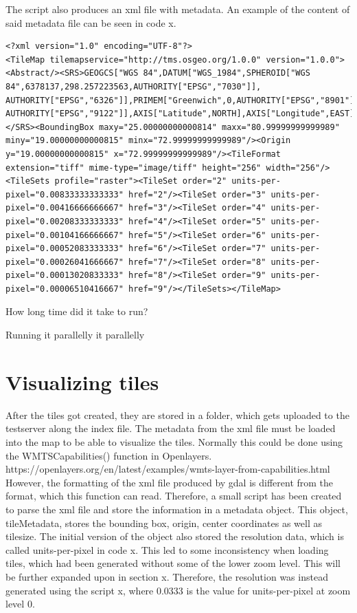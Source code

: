 The script also produces an xml file with metadata. An example of the content of said metadata file can be seen in code x.

\begin{lstlisting}[language=HTML5, caption={The metadata from the xml file generated by the modified gdal2tiles}, label= VoresHTML,escapechar=|]
<?xml version="1.0" encoding="UTF-8"?>
<TileMap tilemapservice="http://tms.osgeo.org/1.0.0" version="1.0.0"><Abstract/><SRS>GEOGCS["WGS 84",DATUM["WGS_1984",SPHEROID["WGS 84",6378137,298.257223563,AUTHORITY["EPSG","7030"]],
AUTHORITY["EPSG","6326"]],PRIMEM["Greenwich",0,AUTHORITY["EPSG","8901"]],UNIT["degree",0.0174532925199433,
AUTHORITY["EPSG","9122"]],AXIS["Latitude",NORTH],AXIS["Longitude",EAST],AUTHORITY["EPSG","4326"]]
</SRS><BoundingBox maxy="25.00000000000814" maxx="80.99999999999989" miny="19.00000000000815" minx="72.99999999999989"/><Origin y="19.00000000000815" x="72.99999999999989"/><TileFormat extension="tiff" mime-type="image/tiff" height="256" width="256"/><TileSets profile="raster"><TileSet order="2" units-per-pixel="0.00833333333333" href="2"/><TileSet order="3" units-per-pixel="0.00416666666667" href="3"/><TileSet order="4" units-per-pixel="0.00208333333333" href="4"/><TileSet order="5" units-per-pixel="0.00104166666667" href="5"/><TileSet order="6" units-per-pixel="0.00052083333333" href="6"/><TileSet order="7" units-per-pixel="0.00026041666667" href="7"/><TileSet order="8" units-per-pixel="0.00013020833333" href="8"/><TileSet order="9" units-per-pixel="0.00006510416667" href="9"/></TileSets></TileMap>
\end{lstlisting}


How long time did it take to run?

Running it parallelly it parallelly 

\section{Visualizing tiles}
After the tiles got created, they are stored in a folder, which gets uploaded to the testserver along the index file. 
The metadata from the xml file must be loaded into the map to be able to visualize the tiles. Normally this could be done using the WMTSCapabilities() function in Openlayers.
https://openlayers.org/en/latest/examples/wmts-layer-from-capabilities.html 
However, the formatting of the xml file produced by gdal is different from the format, which this function can read. Therefore, a small script has been created to parse the xml file and store the information in a metadata object. This object, tileMetadata, stores the bounding box, origin, center coordinates as well as tilesize. The initial version of the object also stored the resolution data, which is called units-per-pixel in code x. This led to some inconsistency when loading tiles, which had been generated without some of the lower zoom level. This will be further expanded upon in section x. Therefore, the resolution was instead generated using the script x, where 0.0333 is the value for units-per-pixel at zoom level 0. 

